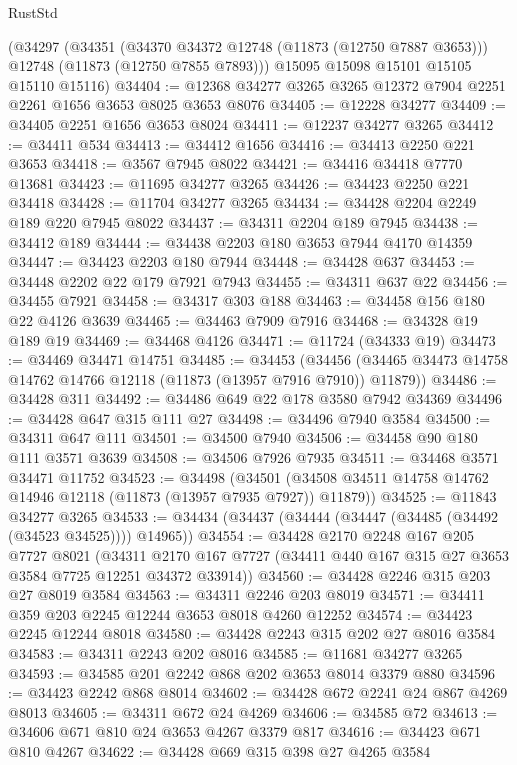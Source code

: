 \begin{lexlean}{RustStd}
\begin{coremodule}
    (@34297
      (@34351
        (@34370 @34372 @12748 (@11873 (@12750 @7887 @3653)))
        @12748
        (@11873 (@12750 @7855 @7893)))
      @15095
      @15098
      @15101
      @15105
      @15110
      @15116)
@34404 := @12368 @34277 @3265 @3265 @12372 @7904 @2251 @2261 @1656 @3653 @8025 @3653 @8076
@34405 := @12228 @34277
@34409 := @34405 @2251 @1656 @3653 @8024
@34411 := @12237 @34277 @3265
@34412 := @34411 @534
@34413 := @34412 @1656
@34416 := @34413 @2250 @221 @3653
@34418 := @3567 @7945 @8022
@34421 := @34416 @34418 @7770 @13681
@34423 := @11695 @34277 @3265
@34426 := @34423 @2250 @221 @34418
@34428 := @11704 @34277 @3265
@34434 := @34428 @2204 @2249 @189 @220 @7945 @8022
@34437 := @34311 @2204 @189 @7945
@34438 := @34412 @189
@34444 := @34438 @2203 @180 @3653 @7944 @4170 @14359
@34447 := @34423 @2203 @180 @7944
@34448 := @34428 @637
@34453 := @34448 @2202 @22 @179 @7921 @7943
@34455 := @34311 @637 @22
@34456 := @34455 @7921
@34458 := @34317 @303 @188
@34463 := @34458 @156 @180 @22 @4126 @3639
@34465 := @34463 @7909 @7916
@34468 := @34328 @19 @189 @19
@34469 := @34468 @4126
@34471 := @11724 (@34333 @19)
@34473 := @34469 @34471 @14751
@34485 := @34453
    (@34456 (@34465 @34473 @14758 @14762 @14766 @12118 (@11873 (@13957 @7916 @7910)) @11879))
@34486 := @34428 @311
@34492 := @34486 @649 @22 @178 @3580 @7942 @34369
@34496 := @34428 @647 @315 @111 @27
@34498 := @34496 @7940 @3584
@34500 := @34311 @647 @111
@34501 := @34500 @7940
@34506 := @34458 @90 @180 @111 @3571 @3639
@34508 := @34506 @7926 @7935
@34511 := @34468 @3571 @34471 @11752
@34523 := @34498
    (@34501 (@34508 @34511 @14758 @14762 @14946 @12118 (@11873 (@13957 @7935 @7927)) @11879))
@34525 := @11843 @34277 @3265
@34533 := @34434 (@34437 (@34444 (@34447 (@34485 (@34492 (@34523 @34525)))) @14965))
@34554 := @34428
    @2170
    @2248
    @167
    @205
    @7727
    @8021
    (@34311 @2170 @167 @7727 (@34411 @440 @167 @315 @27 @3653 @3584 @7725 @12251 @34372 @33914))
@34560 := @34428 @2246 @315 @203 @27 @8019 @3584
@34563 := @34311 @2246 @203 @8019
@34571 := @34411 @359 @203 @2245 @12244 @3653 @8018 @4260 @12252
@34574 := @34423 @2245 @12244 @8018
@34580 := @34428 @2243 @315 @202 @27 @8016 @3584
@34583 := @34311 @2243 @202 @8016
@34585 := @11681 @34277 @3265
@34593 := @34585 @201 @2242 @868 @202 @3653 @8014 @3379 @880
@34596 := @34423 @2242 @868 @8014
@34602 := @34428 @672 @2241 @24 @867 @4269 @8013
@34605 := @34311 @672 @24 @4269
@34606 := @34585 @72
@34613 := @34606 @671 @810 @24 @3653 @4267 @3379 @817
@34616 := @34423 @671 @810 @4267
@34622 := @34428 @669 @315 @398 @27 @4265 @3584

\end{coremodule}
\end{lexlean}
